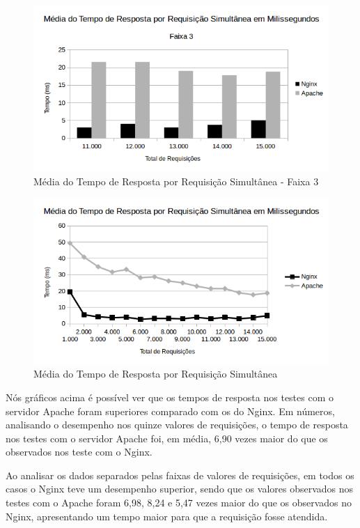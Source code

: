 \begin{figure}[H]
	\centering
	\includegraphics[width=1\linewidth]{graficos/grafico5-f3} 
	\caption{Média do Tempo de Resposta por Requisição Simultânea - Faixa 3}
	\label{fig:grafico5-f3}
\end{figure}

\begin{figure}[H]
	\centering
	\includegraphics[width=1\linewidth]{graficos/grafico5} 
	\caption{Média do Tempo de Resposta por Requisição Simultânea}
	\label{fig:grafico5}
\end{figure}

Nós gráficos acima é possível ver que os tempos de resposta nos testes com o 
servidor 
Apache foram superiores comparado com os do Nginx. Em números, analisando o 
desempenho nos quinze valores de requisições, o tempo de resposta nos testes 
com o servidor Apache foi, em média, 6,90 vezes maior do que os observados nos 
teste com o Nginx.

Ao analisar os dados separados pelas faixas de valores de requisições, em todos 
os casos o Nginx teve um desempenho superior, sendo que os valores observados 
nos testes com o Apache foram 6,98, 8,24 e 5,47 vezes maior do que os 
observados no Nginx, apresentando um tempo maior para que a requisição fosse 
atendida.

